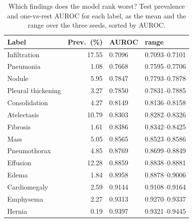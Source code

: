 \begin{table}[t]
\caption{Which findings does the model rank worst? Test prevalence and one-vs-rest AUROC for each label, as the mean and the range over the three seeds, sorted by AUROC.}
\label{tab:perlabel}
\centering
\footnotesize
\setlength{\tabcolsep}{4pt}
\begin{tabular}{@{}lrll@{}}
\toprule
Label & Prev.\ (\%) & AUROC & range \\
\midrule
Infiltration & 17.55 & 0.7096 & 0.7093--0.7101 \\
Pneumonia & 1.08 & 0.7668 & 0.7595--0.7706 \\
Nodule & 5.95 & 0.7847 & 0.7793--0.7878 \\
Pleural thickening & 3.27 & 0.7850 & 0.7831--0.7885 \\
Consolidation & 4.27 & 0.8149 & 0.8136--0.8158 \\
Atelectasis & 10.79 & 0.8303 & 0.8282--0.8326 \\
Fibrosis & 1.61 & 0.8386 & 0.8342--0.8425 \\
Mass & 5.05 & 0.8565 & 0.8523--0.8586 \\
Pneumothorax & 4.85 & 0.8769 & 0.8699--0.8849 \\
Effusion & 12.28 & 0.8859 & 0.8838--0.8881 \\
Edema & 1.84 & 0.8958 & 0.8878--0.9006 \\
Cardiomegaly & 2.59 & 0.9144 & 0.9108--0.9164 \\
Emphysema & 2.27 & 0.9313 & 0.9270--0.9337 \\
Hernia & 0.19 & 0.9397 & 0.9321--0.9445 \\
\bottomrule
\end{tabular}
\end{table}
